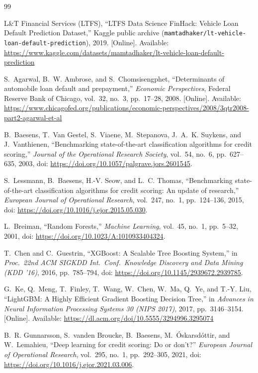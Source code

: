 {}
{\raggedright
\begin{thebibliography}{99}

L\&T Financial Services (LTFS), ``LTFS Data Science FinHack: Vehicle Loan Default Prediction Dataset,'' Kaggle public archive (\texttt{mamtadhaker/lt-vehicle-loan-default-prediction}), 2019. [Online]. Available: \url{https://www.kaggle.com/datasets/mamtadhaker/lt-vehicle-loan-default-prediction}

S.~Agarwal, B.~W. Ambrose, and S.~Chomsisengphet, ``Determinants of automobile loan default and prepayment,'' \textit{Economic Perspectives}, Federal Reserve Bank of Chicago, vol.~32, no.~3, pp.~17--28, 2008. [Online]. Available: \url{https://www.chicagofed.org/publications/economic-perspectives/2008/3qtr2008-part2-agarwal-et-al}

B.~Baesens, T.~Van Gestel, S.~Viaene, M.~Stepanova, J.~A.~K. Suykens, and J.~Vanthienen, ``Benchmarking state-of-the-art classification algorithms for credit scoring,'' \textit{Journal of the Operational Research Society}, vol.~54, no.~6, pp.~627--635, 2003, doi: \url{https://doi.org/10.1057/palgrave.jors.2601545}.

S.~Lessmann, B.~Baesens, H.-V. Seow, and L.~C. Thomas, ``Benchmarking state-of-the-art classification algorithms for credit scoring: An update of research,'' \textit{European Journal of Operational Research}, vol.~247, no.~1, pp.~124--136, 2015, doi: \url{https://doi.org/10.1016/j.ejor.2015.05.030}.

L.~Breiman, ``Random Forests,'' \textit{Machine Learning}, vol.~45, no.~1, pp.~5--32, 2001, doi: \url{https://doi.org/10.1023/A:1010933404324}.

T.~Chen and C.~Guestrin, ``XGBoost: A Scalable Tree Boosting System,'' in \textit{Proc.\ 22nd ACM SIGKDD Int.\ Conf.\ Knowledge Discovery and Data Mining (KDD '16)}, 2016, pp.~785--794, doi: \url{https://doi.org/10.1145/2939672.2939785}.

G.~Ke, Q.~Meng, T.~Finley, T.~Wang, W.~Chen, W.~Ma, Q.~Ye, and T.-Y. Liu, ``LightGBM: A Highly Efficient Gradient Boosting Decision Tree,'' in \textit{Advances in Neural Information Processing Systems 30 (NIPS 2017)}, 2017, pp.~3146--3154. [Online]. Available: \url{https://dl.acm.org/doi/10.5555/3294996.3295074}

B.~R. Gunnarsson, S.~vanden Broucke, B.~Baesens, M.~\'Oskarsd\'ottir, and W.~Lemahieu, ``Deep learning for credit scoring: Do or don't?'' \textit{European Journal of Operational Research}, vol.~295, no.~1, pp.~292--305, 2021, doi: \url{https://doi.org/10.1016/j.ejor.2021.03.006}.


\end{thebibliography}}
